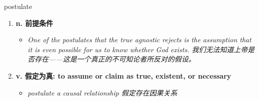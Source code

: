 
\begin{frame}
{\huge postulate}
\begin{center}
\begin{enumerate}\Large
  \item \textbf{n. 前提条件}
  \begin{itemize}
    \item \em{\Large{One of the postulates that the true agnostic rejects is the assumption that it is even possible for us to know whether God exists. 我们无法知道上帝是否存在——这是一个真正的不可知论者所反对的假设。}}
  \end{itemize}
  \item \textbf{v. 假定为真: to assume or claim as true, existent, or necessary}
  \begin{itemize}
    \item \em{\Large{postulate a causal relationship 假定存在因果关系}}
  \end{itemize}
\end{enumerate}
\end{center}
\end{frame}
